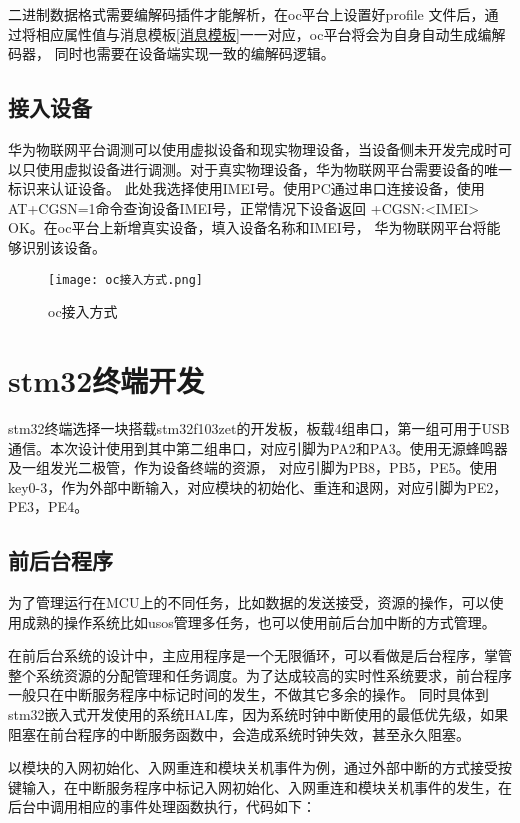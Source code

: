 二进制数据格式需要编解码插件才能解析，在oc平台上设置好profile 文件后，通过将相应属性值与消息模板\ref{消息模板}一一对应，oc平台将会为自身自动生成编解码器，
同时也需要在设备端实现一致的编解码逻辑。


\subsection{接入设备}
华为物联网平台调测可以使用虚拟设备和现实物理设备，当设备侧未开发完成时可以只使用虚拟设备进行调测。对于真实物理设备，华为物联网平台需要设备的唯一标识来认证设备。
此处我选择使用IMEI号。使用PC通过串口连接设备，使用AT+CGSN=1命令查询设备IMEI号，正常情况下设备返回 +CGSN:<IMEI> OK。在oc平台上新增真实设备，填入设备名称和IMEI号，
华为物联网平台将能够识别该设备。
\begin{figure}[h]
	\texttt{[image: oc接入方式.png]}
	\caption{oc接入方式}
	\label{oc接入方式}
\end{figure}


\section{stm32终端开发}
stm32终端选择一块搭载stm32f103zet的开发板，板载4组串口，第一组可用于USB通信。本次设计使用到其中第二组串口，对应引脚为PA2和PA3。使用无源蜂鸣器及一组发光二极管，作为设备终端的资源，
对应引脚为PB8，PB5，PE5。使用key0-3，作为外部中断输入，对应模块的初始化、重连和退网，对应引脚为PE2，PE3，PE4。

\subsection{前后台程序}
为了管理运行在MCU上的不同任务，比如数据的发送接受，资源的操作，可以使用成熟的操作系统比如usos管理多任务，也可以使用前后台加中断的方式管理。

在前后台系统的设计中，主应用程序是一个无限循环，可以看做是后台程序，掌管整个系统资源的分配管理和任务调度。为了达成较高的实时性系统要求，前台程序一般只在中断服务程序中标记时间的发生，不做其它多余的操作。
同时具体到stm32嵌入式开发使用的系统HAL库，因为系统时钟中断使用的最低优先级，如果阻塞在前台程序的中断服务函数中，会造成系统时钟失效，甚至永久阻塞。

以模块的入网初始化、入网重连和模块关机事件为例，通过外部中断的方式接受按键输入，在中断服务程序中标记入网初始化、入网重连和模块关机事件的发生，在后台中调用相应的事件处理函数执行，代码如下：

